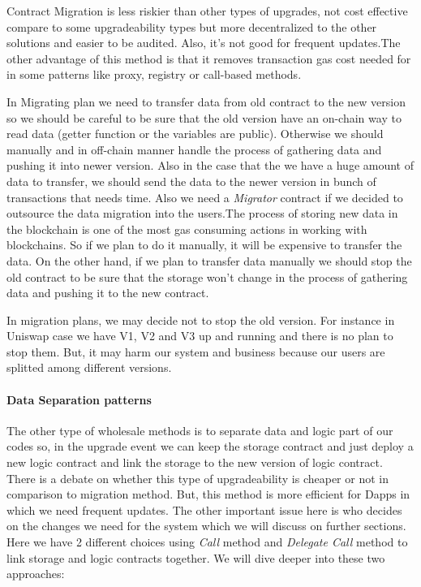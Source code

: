 Contract Migration is less riskier than other types of upgrades, not cost effective compare to some upgradeability types but more decentralized to the other solutions and easier to be audited. Also, it's not good for frequent updates.The other advantage of this method is that it removes transaction gas cost needed for in some patterns like proxy, registry or call-based methods.

In Migrating plan we need to transfer data from old contract to the new version so we should be careful to be sure that the old version have an on-chain way to read data (getter function or the variables are public). Otherwise we should manually and in off-chain manner handle the process of gathering data and pushing it into newer version. Also in the case that the we have a huge amount of data to transfer, we should send the data to the newer version in bunch of transactions that needs time. Also we need a \textit{Migrator} contract if we decided to outsource the data migration into the users.The process of storing new data in the blockchain is one of the most gas consuming actions in working with blockchains. So if we plan to do it manually, it will be expensive to transfer the data. On the other hand, if we plan to transfer data manually we should stop the old contract to be sure that the storage won't change in the process of gathering data and pushing it to the new contract. 

In migration plans, we may decide not to stop the old version. For instance in Uniswap case we have V1, V2 and V3 up and running and there is no plan to stop them. But, it may harm our system and business because our users are splitted among different versions. 

\paragraph{Data Separation patterns}


The other type of wholesale methods is to separate data and logic part of our codes so, in the upgrade event we can keep the storage contract and just deploy a new logic contract and link the storage to the new version of logic contract.
There is a debate on whether this type of upgradeability is cheaper or not in comparison to migration method. But, this method is more efficient for Dapps in which we need frequent updates. The other important issue here is who decides on the changes we need for the system which we will discuss on further sections.
Here we have 2 different choices using \textit{Call} method and \textit{Delegate Call} method to link storage and logic contracts together. We will dive deeper into these two approaches:

